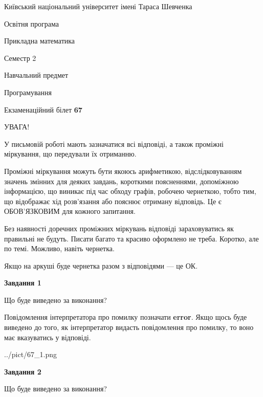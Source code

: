 \documentclass[12pt, ukrainian]{article}
\begin{document}
{{\begin {small}\par
{ \center  Київський національний університет імені Тараса Шевченка \par}
{\parbox {5 cm}{Освітня програма \hfill}{\parbox {7 cm}{Прикладна математика \hfill}}\parbox {6 cm}{\hfill Семестр 2}}\par
{\parbox {5 cm} {Навчальний предмет \hfill}\parbox {7 cm}{Програмування \hfill}\parbox {6cm}{\hfill}\par}\vspace{-7pt} \end{small}}{\center Екзаменаційний білет \No \textbf
{ 67 }\par}}
{
\begin {large}
УВАГА!

У письмовій роботі мають зазначатися всі відповіді, а також проміжні міркування, що передували їх отриманню.

Проміжні міркування можуть бути якоюсь арифметикою, відслідковуванням зна\-чень змінних для деяких завдань,
короткими поясненнями, допоміжною інформацією, що виникає під час обходу графів, робочею чернеткою,
тобто тим, що відображає хід розв’язання або пояснює отриману відповідь.
Це є ОБОВ’ЯЗКОВИМ для кожного запитання.

Без наявності доречних проміжних міркувань відповіді зараховуватись як правиль\-ні не будуть.
Писати багато та красиво оформлено не треба. Коротко, але по темі. Можли\-во, навіть чернетка.

Якщо на аркуші буде чернетка разом з відповідями --- це ОК.

\newpage

{\begin {center}\textbf{Завдання 1}\end {center}}\par
Що буде виведено за виконання?

Повідомлення інтерпретатора про помилку позначати \textbf{error}.
Якщо щось буде виведено до того, як інтерпретатор видасть повідомлення про помилку, 
то воно має вказуватись у відповіді. \par


\begin{center}
	{../pict/67_1.png}
\end{center}
\newpage

{\begin {center}\textbf{Завдання 2}\end {center}}\par
Що буде виведено за виконання?


\end{large}}
\end{document}
